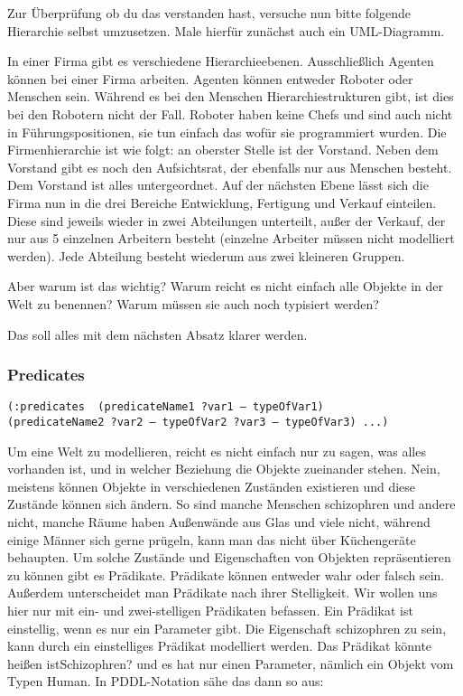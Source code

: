 \documentclass[koma,DIV=1,BCOR=1mm]{article}
\begin{document}
Zur Überprüfung ob du das verstanden hast, versuche nun bitte folgende
Hierarchie selbst umzusetzen. Male hierfür zunächst auch ein
UML-Diagramm.

In einer Firma gibt es verschiedene Hierarchieebenen. Ausschließlich
Agenten können bei einer Firma arbeiten. Agenten können entweder
Roboter oder Menschen sein. Während es bei den Menschen
Hierarchiestrukturen gibt, ist dies bei den Robotern nicht der Fall.
Roboter haben keine Chefs und sind auch nicht in Führungspositionen,
sie tun einfach das wofür sie programmiert wurden. Die
Firmenhierarchie ist wie folgt: an oberster Stelle ist der Vorstand.
Neben dem Vorstand gibt es noch den Aufsichtsrat, der ebenfalls nur
aus Menschen besteht. Dem Vorstand ist alles untergeordnet. Auf der
nächsten Ebene lässt sich die Firma nun in die drei Bereiche
Entwicklung, Fertigung und Verkauf einteilen. Diese sind jeweils
wieder in zwei Abteilungen unterteilt, außer der Verkauf, der nur aus
5 einzelnen Arbeitern besteht (einzelne Arbeiter müssen nicht
modelliert werden). Jede Abteilung besteht wiederum aus zwei kleineren
Gruppen.

Aber warum ist das wichtig? Warum reicht es nicht einfach alle Objekte
in der Welt zu benennen? Warum müssen sie auch noch typisiert werden?

Das soll alles mit dem nächsten Absatz klarer werden.
\subsubsection{Predicates}
\label{sec-2-3-4}
\begin{verbatim}
(:predicates  (predicateName1 ?var1 – typeOfVar1)
(predicateName2 ?var2 – typeOfVar2 ?var3 – typeOfVar3) ...)
\end{verbatim}

Um eine Welt zu modellieren, reicht es nicht einfach nur zu sagen, was
alles vorhanden ist, und in welcher Beziehung die Objekte zueinander
stehen. Nein, meistens können Objekte in verschiedenen Zuständen
existieren und diese Zustände können sich ändern. So sind manche
Menschen schizophren und andere nicht, manche Räume haben Außenwände
aus Glas und viele nicht, während einige Männer sich gerne prügeln,
kann man das nicht über Küchengeräte behaupten. Um solche Zustände und
Eigenschaften von Objekten repräsentieren zu können gibt es Prädikate.
Prädikate können entweder wahr oder falsch sein. Außerdem
unterscheidet man Prädikate nach ihrer Stelligkeit. Wir wollen uns
hier nur mit ein- und zwei-stelligen Prädikaten befassen. Ein Prädikat
ist einstellig, wenn es nur ein Parameter gibt. Die Eigenschaft
schizophren zu sein, kann durch ein einstelliges Prädikat modelliert
werden. Das Prädikat könnte heißen istSchizophren? und es hat nur
einen Parameter, nämlich ein Objekt vom Typen Human. In PDDL-Notation
sähe das dann so aus:
\end{document}
